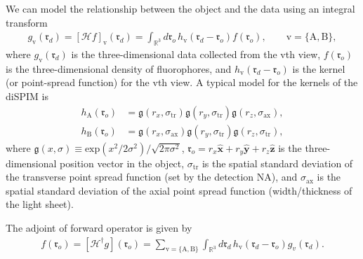 \documentclass[11pt]{article}
\providecommand{\mc}[1]{\mathcal{#1}}
\providecommand{\ro}[1]{\mathbf{\mathfrak{r}}_o}
\providecommand{\rd}[1]{\mathbf{\mathfrak{r}}_d}
\providecommand{\mh}[1]{\mathbf{\hat{#1}}}
\providecommand{\mf}[1]{\mathfrak{#1}}
\providecommand{\mbb}[1]{\mathbb{#1}}
\begin{document}
We can model the relationship between the object and the data using an integral
transform
\begin{align}
  g_{\text{v}}(\rd{}) = \left[\mc{H}f\right]_{\text{v}}(\rd{}) = \int_{\mbb{R}^3}d\ro{}\, h_{\text{v}}(\rd{} - \ro{})f(\ro{}), \qquad \text{v} = \{\text{A}, \text{B}\}, 
\end{align}
where $g_{\text{v}}(\rd{})$ is the three-dimensional data collected from the
$\text{v}$th view, $f(\ro{})$ is the three-dimensional density of fluorophores,
and $h_{\text{v}}(\rd{} - \ro{})$ is the kernel (or point-spread function) for
the ${\text{v}}$th view. A typical model for the kernels of the diSPIM is
\begin{align}
  h_{\text{A}}(\ro{}) &= \mf{g}(r_x, \sigma_{\text{tr}})\mf{g}(r_y, \sigma_{\text{tr}})\mf{g}(r_z, \sigma_{\text{ax}}), \label{eq:ha}\\
  h_{\text{B}}(\ro{}) &= \mf{g}(r_x, \sigma_{\text{ax}})\mf{g}(r_y, \sigma_{\text{tr}})\mf{g}(r_z, \sigma_{\text{tr}}), \label{eq:hb}
\end{align}
where $\mf{g}(x, \sigma) \equiv \text{exp}(x^2/2\sigma^2)/\sqrt{2\pi\sigma^2}$,
$\ro{} = r_x\mh{x} + r_y\mh{y} + r_z\mh{z}$ is the three-dimensional position
vector in the object, $\sigma_{\text{tr}}$ is the spatial standard deviation of
the transverse point spread function (set by the detection NA), and
$\sigma_{\text{ax}}$ is the spatial standard deviation of the axial point spread
function (width/thickness of the light sheet).

The adjoint of forward operator is given by
\begin{align}
  f(\ro{}) = [\mc{H}^{\dagger}g](\ro{}) = \sum_{{\text{v}} = \{\text{A}, \text{B}\}}\int_{\mbb{R}^3}d\rd{}\, h_{\text{v}}(\rd{} - \ro{})g_v(\rd{}). 
\end{align}
\end{document}
